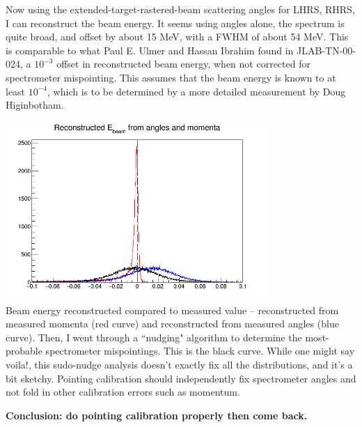 \documentclass{article}
\begin{document}
Now using the extended-target-rastered-beam scattering angles for LHRS, RHRS, I can reconstruct the beam energy. It seems using angles alone, the spectrum is quite broad, and offset by about 15 MeV, with a FWHM of about 54 MeV. This is comparable to what Paul E. Ulmer and Hassan Ibrahim found in JLAB-TN-00-024, a $10^{-3}$ offset in reconstructed beam energy, when not corrected for spectrometer mispointing. This assumes that the beam energy is known to at least $10^{-4}$, which is to be determined by a more detailed measurement by Doug Higinbotham.\\


\begin{center}
\includegraphics[width=10cm]{delEn2.png}\\
Beam energy reconstructed compared to measured value -- reconstructed from measured momenta (red curve) and reconstructed from measured angles (blue curve). Then, I went through a ``nudging" algorithm to determine the most-probable spectrometer mispointings. This is the black curve. While one might say voila!, this sudo-nudge analysis doesn't exactly fix all the distributions, and it's a bit sketchy. Pointing calibration should independently fix spectrometer angles and not fold in other calibration errors such as momentum.
\end{center}

\textbf{Conclusion: do pointing calibration properly then come back.}






\clearpage





\end{document}
